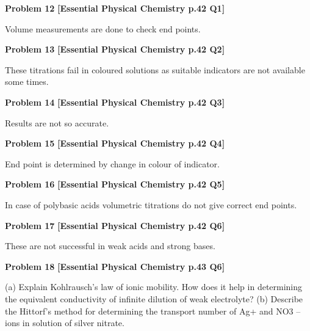 \begin{problembox}
\textbf{Problem 12} \hfill \textbf{[Essential Physical Chemistry p.42 Q1]}
\label{q:ext-essential_all_questions-12}

Volume measurements are done to check
end points.
\end{problembox}

\begin{problembox}
\textbf{Problem 13} \hfill \textbf{[Essential Physical Chemistry p.42 Q2]}
\label{q:ext-essential_all_questions-13}

These titrations fail  in coloured solutions
as suitable indicators are not available some
times.
\end{problembox}

\begin{problembox}
\textbf{Problem 14} \hfill \textbf{[Essential Physical Chemistry p.42 Q3]}
\label{q:ext-essential_all_questions-14}

Results are not so accurate.
\end{problembox}

\begin{problembox}
\textbf{Problem 15} \hfill \textbf{[Essential Physical Chemistry p.42 Q4]}
\label{q:ext-essential_all_questions-15}

End point is determined by change in
colour of indicator.
\end{problembox}

\begin{problembox}
\textbf{Problem 16} \hfill \textbf{[Essential Physical Chemistry p.42 Q5]}
\label{q:ext-essential_all_questions-16}

In case of polybasic acids volumetric
titrations do not give correct end points.
\end{problembox}

\begin{problembox}
\textbf{Problem 17} \hfill \textbf{[Essential Physical Chemistry p.42 Q6]}
\label{q:ext-essential_all_questions-17}

These are not successful in weak acids and
strong bases.
\end{problembox}

\begin{problembox}
\textbf{Problem 18} \hfill \textbf{[Essential Physical Chemistry p.43 Q6]}
\label{q:ext-essential_all_questions-18}

(a)
Explain Kohlrausch's law of ionic mobility. How does it help in determining the equivalent
conductivity of infinite dilution of weak electrolyte?
(b)
Describe the Hittorf's method for determining the transport number of Ag+ and NO3
-- ions in
solution of silver nitrate.
\end{problembox}

